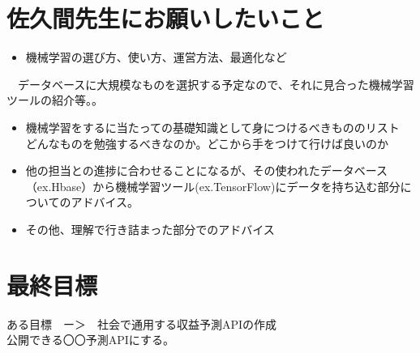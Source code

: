 \documentclass{scrartcl}
\begin{document}
\section{佐久間先生にお願いしたいこと}
\label{sec:org83bcdf5}
\begin{itemize}
\item 機械学習の選び方、使い方、運営方法、最適化など\\
\end{itemize}
　データベースに大規模なものを選択する予定なので、それに見合った機械学習ツールの紹介等。。\\
\begin{itemize}
\item 機械学習をするに当たっての基礎知識として身につけるべきもののリスト\\
どんなものを勉強するべきなのか。どこから手をつけて行けば良いのか\\
\item 他の担当との進捗に合わせることになるが、その使われたデータベース（ex.Hbase）から機械学習ツール(ex.TensorFlow)にデータを持ち込む部分についてのアドバイス。\\
\item その他、理解で行き詰まった部分でのアドバイス\\
\end{itemize}
\section{最終目標}
\label{sec:orgea17abf}
ある目標　ー＞　社会で通用する収益予測APIの作成\\
公開できる〇〇予測APIにする。\\
\end{document}
